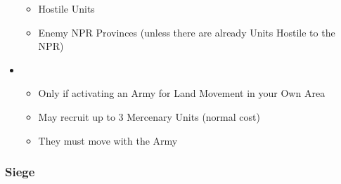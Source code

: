 \documentclass[10pt]{article}
\begin{document}
\begin{itemize}
\begin{itemize}
		\item Hostile Units
		\item Enemy NPR Provinces (unless there are already Units Hostile to the NPR)
	\end{itemize}
	\item {}
	\begin{itemize}
		\item Only if activating an Army for Land Movement in your Own Area
		\item May recruit up to 3 Mercenary Units (normal cost)
		\item They must move with the Army
	\end{itemize}
\end{itemize}

\subsubsection*{Siege }
\end{document}
